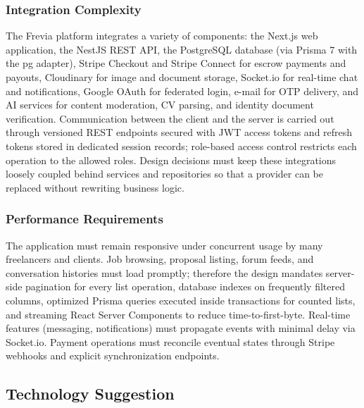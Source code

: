\subsubsection{Integration Complexity}

The Frevia platform integrates a variety of components: the Next.js web application, the NestJS REST API, the PostgreSQL database (via Prisma 7 with the pg adapter), Stripe Checkout and Stripe Connect for escrow payments and payouts, Cloudinary for image and document storage, Socket.io for real-time chat and notifications, Google OAuth for federated login, e-mail for OTP delivery, and AI services for content moderation, CV parsing, and identity document verification. Communication between the client and the server is carried out through versioned REST endpoints secured with JWT access tokens and refresh tokens stored in dedicated session records; role-based access control restricts each operation to the allowed roles. Design decisions must keep these integrations loosely coupled behind services and repositories so that a provider can be replaced without rewriting business logic.

\subsubsection{Performance Requirements}

The application must remain responsive under concurrent usage by many freelancers and clients. Job browsing, proposal listing, forum feeds, and conversation histories must load promptly; therefore the design mandates server-side pagination for every list operation, database indexes on frequently filtered columns, optimized Prisma queries executed inside transactions for counted lists, and streaming React Server Components to reduce time-to-first-byte. Real-time features (messaging, notifications) must propagate events with minimal delay via Socket.io. Payment operations must reconcile eventual states through Stripe webhooks and explicit synchronization endpoints.

\subsection{Technology Suggestion}

